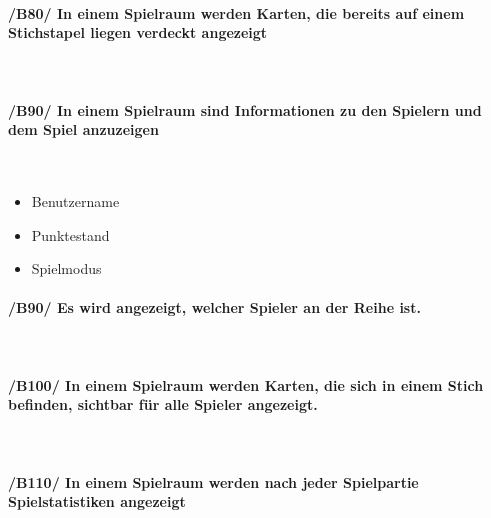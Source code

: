 	\paragraph{/B80/ In einem Spielraum werden Karten, die bereits auf einem Stichstapel liegen verdeckt angezeigt}\hspace{1mm}\\
	\paragraph{/B90/ In einem Spielraum sind Informationen zu den Spielern und dem Spiel anzuzeigen}\hspace{1mm}\\
		\begin{itemize}
			\item Benutzername
		\end{itemize}
		\begin{itemize}
			\item Punktestand
		\end{itemize}
		\begin{itemize}
			\item Spielmodus
		\end{itemize}
	\paragraph{/B90/ Es wird angezeigt, welcher Spieler an der Reihe ist.}\hspace{1mm}\\
	\paragraph{/B100/ In einem Spielraum werden Karten, die sich in einem Stich befinden, sichtbar für alle Spieler angezeigt.}\hspace{1mm}\\
	\paragraph{/B110/ In einem Spielraum werden nach jeder Spielpartie Spielstatistiken angezeigt}\hspace{1mm}\\
	
